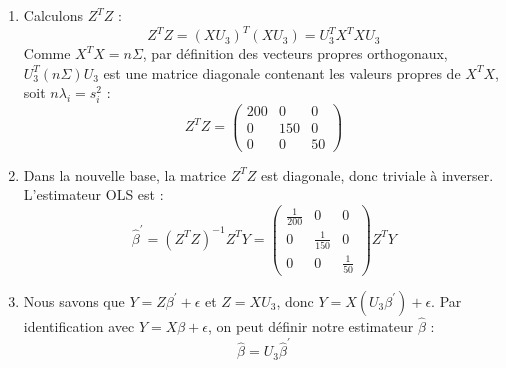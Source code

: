\documentclass[solutions]{../exercices}
\begin{document}
\begin{solution}
\begin{enumerate}
		\item Calculons $Z^T Z$ :
		\[ Z^T Z = (X U_3)^T (X U_3) = U_3^T X^T X U_3 \]
		Comme $X^T X = n \Sigma$, par définition des vecteurs propres orthogonaux, $U_3^T (n\Sigma) U_3$ est une matrice diagonale contenant les valeurs propres de $X^T X$, soit $n \lambda_i = s_i^2$ :
		\[ Z^T Z = \begin{pmatrix} 200 & 0 & 0 \\ 0 & 150 & 0 \\ 0 & 0 & 50 \end{pmatrix} \]

		\item Dans la nouvelle base, la matrice $Z^T Z$ est diagonale, donc triviale à inverser. L'estimateur OLS est :
		\[ \hat{\beta}^{'} = (Z^T Z)^{-1} Z^T Y = \begin{pmatrix} \frac{1}{200} & 0 & 0 \\ 0 & \frac{1}{150} & 0 \\ 0 & 0 & \frac{1}{50} \end{pmatrix} Z^T Y \]

		\item Nous savons que $Y = Z \beta^{'} + \epsilon$ et $Z = X U_3$, donc $Y = X (U_3 \beta^{'}) + \epsilon$. Par identification avec $Y = X \beta + \epsilon$, on peut définir notre estimateur $\hat{\beta}$ :
		\[ \hat{\beta} = U_3 \hat{\beta}^{'} \]
	\end{enumerate}
\end{solution}
\end{document}
